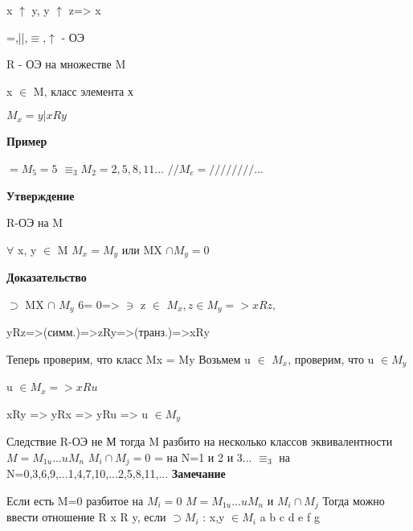 \documentclass{article}
\begin{document}
x $\uparrow$ y, y $\uparrow$ z=> x 

=,||,$\equiv$,$\uparrow$ - ОЭ

R - ОЭ на множестве M

x $\in$ M, класс элемента х

$M_{x}=y|x Ry$

\textbf{Пример}

$= M_5=5$
$\equiv_{3} M_2=2,5,8,11...$
$// M_{e}=////////...$

\textbf{Утверждение}

R-ОЭ на M

$\forall$ x, y $\in$ M $M_{x} = M_{y}$ или MX $\cap M_{y}=0$

\textbf{Доказательство}

$\supset$ MX $\cap$ $M_{y}$ 6= 0=> $\ni$ z $\in$ $M_{x}, z \in M_{y} =>xRz,$

yRz=>(симм.)=>zRy=>(транз.)=>xRy

Теперь проверим, что класс Mx = My
Возьмем u $\in$ $M_{x}$, проверим, что u $\in M_{y}$

u $\in M_{x} => xRu$

xRy => yRx => yRu => u $\in M_{y}$

Следствие R-ОЭ не М
тогда M разбито на несколько классов эквивалентности
$M=M_{1u}...uM_{n}$
$M_{i} \cap M_{j}=0$
= на N=1 и 2 и 3...
$\equiv_{3}$ на N=0,3,6,9,...1,4,7,10,...2,5,8,11,...
\textbf{Замечание}

Если есть M=0 разбитое на $M_{i}=0$
$M=M_{1u}...u M_{n}$ и $M_{i} \cap M_{j}$
Тогда можно ввести отношение R
x R y, если $\supset M_{i}$
: x,y $\in M_{i}$
a b c d e f g

\end{document}
